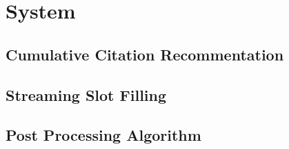 
\section{System}

\subsection{Cumulative Citation Recommentation}


\subsection{Streaming Slot Filling}


\subsection{Post Processing Algorithm}


